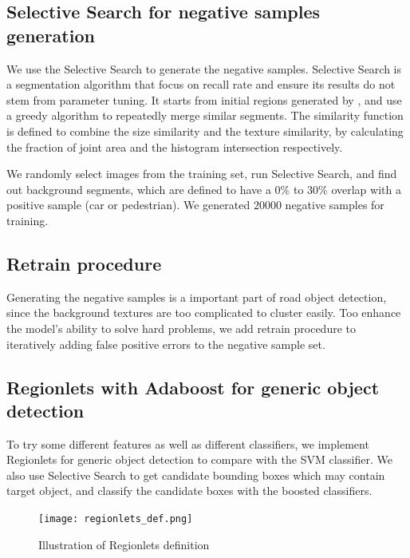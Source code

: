 \documentclass{article} %
\begin{document}
\subsection{Selective Search for negative samples generation}

We use the Selective Search \cite{van2011segmentation} to generate the negative samples. Selective Search is a segmentation algorithm that focus on recall rate and ensure its results do not stem from parameter tuning. It starts from initial regions generated by \cite{felzenszwalb2004efficient}, and use a greedy algorithm to repeatedly merge similar segments. The similarity function is defined to combine the size similarity and the texture similarity, by calculating the fraction of joint area and the histogram intersection respectively.

We randomly select images from the training set, run Selective Search, and find out background segments, which are defined to have a $0\%$ to $30\%$ overlap with a positive sample (car or pedestrian). We generated $20000$ negative samples for training. 

\subsection{Retrain procedure}

Generating the negative samples is a important part of road object detection, since the background textures are too complicated to cluster easily. Too enhance the model's ability to solve hard problems, we add retrain procedure \cite{felzenszwalb2010object} to iteratively adding false positive errors to the negative sample set.


\subsection{Regionlets with Adaboost for generic object detection}

To try some different features as well as different classifiers, we implement Regionlets \cite{Wang2013} for generic object detection to compare with the SVM classifier. We also use Selective Search \cite{van2011segmentation} to get candidate bounding boxes which may contain target object, and classify the candidate boxes with the boosted classifiers.


\begin{figure}[htb]
	\centering
	\texttt{[image: regionlets\_def.png]}
	\caption{Illustration of Regionlets definition}
	\label{fig:regionlet_def}
\end{figure}
\end{document}
